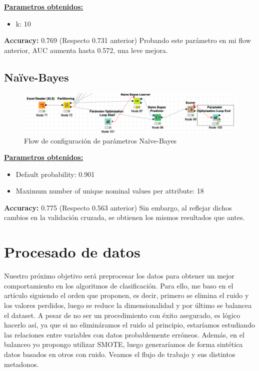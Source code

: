 \underline{\textbf{Parametros obtenidos:}} \\
\begin{itemize}
	\item k: 10
\end{itemize}

\textbf{Accuracy:} 0.769 (Respecto 0.731 anterior)
Probando este parámetro en mi flow anterior, AUC aumenta hasta 0.572, una leve mejora.

\subsection{Naïve-Bayes}

\begin{figure}[H] %
	\centering
	\includegraphics[scale=0.38]{flow-param-nb.png}  %
	\caption{Flow de configuración de parámetros Naïve-Bayes} 
	\label{fig:conf-nb}
\end{figure}

\underline{\textbf{Parametros obtenidos:}} \\
\begin{itemize}
	\item Default probability: 0.901
	\item Maximum number of unique nominal values per attribute: 18
\end{itemize}

\textbf{Accuracy:} 0.775 (Respecto 0.563 anterior)
Sin embargo, al reflejar dichos cambios en la validación cruzada, se obtienen los mismos resultados que antes.



\section{Procesado de datos}

Nuestro próximo objetivo será preprocesar los datos para obtener un mejor comportamiento en los algoritmos de clasificación. Para ello,  me baso en el artículo \cite{preprocessing} siguiendo el orden que proponen, es decir, primero se elimina el ruido y los valores perdidos, luego se reduce la dimensionalidad y por último se balancea el dataset. A pesar de no ser un procedimiento con éxito asegurado, es lógico hacerlo así, ya que si no elimináramos el ruido al principio, estaríamos estudiando las relaciones entre variables con datos probablemente erróneos. Además, en el balanceo yo propongo utilizar SMOTE, luego generaríamos de forma sintética datos basados en otros con ruido. Veamos el flujo de trabajo y sus distintos metadonos.

